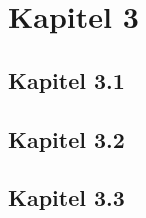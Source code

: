 \section{Kapitel 3}\label{sec:3} \thispagestyle{firstsection}
\subsection{Kapitel 3.1} \label{sec:3_1}



\subsection{Kapitel 3.2} \label{sec:3_2}



\subsection{Kapitel 3.3} \label{sec:3_3}

